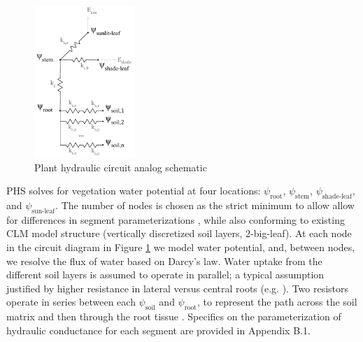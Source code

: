 \documentclass[draft,linenumbers]{agujournal}
\begin{document}
  \begin{figure}[h]
     \centering
     \includegraphics[width=9pc]{../figs/circuit.pdf}
     \caption{Plant hydraulic circuit analog schematic}
     \label{circuit}
  \end{figure}


  PHS solves for vegetation water potential at four locations: $\psi_{\text{root}}$, $\psi_{\text{stem}}$, $\psi_{\text{shade-leaf}}$, and $\psi_{\text{sun-leaf}}$.
  The number of nodes is chosen as the strict minimum to allow allow for differences in segment parameterizations \citep{simonin2015, sperry2015}, while also conforming to existing CLM model structure (vertically discretized soil layers, 2-big-leaf).
  At each node in the circuit diagram in Figure \ref{circuit} we model water potential, and, between nodes, we resolve the flux of water based on Darcy's law. 
  Water uptake from the different soil layers is assumed to operate in parallel; a typical assumption justified by higher resistance in lateral versus central roots (e.g. \cite{williams2001}). 
  Two resistors operate in series between each $\psi_{\text{soil}}$ and $\psi_{\text{root}}$, to represent the path across the soil matrix and then through the root tissue \citep{williams1996}. 
  Specifics on the parameterization of hydraulic conductance for each segment are provided in Appendix B.1.
\end{document}
